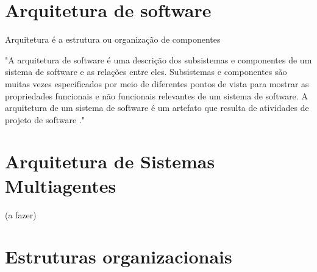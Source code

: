 \section{Arquitetura de software}

Arquitetura é a estrutura ou organização de componentes 

\begin{citacao}
"A arquitetura de software é uma descrição dos subsistemas e componentes de um sistema de software e as relações entre eles. Subsistemas e componentes são muitas vezes especificados por meio de diferentes pontos de vista para mostrar as propriedades funcionais e não funcionais relevantes de um sistema de software. A arquitetura de um sistema de software é um artefato que resulta de atividades de projeto de software \cite{buschmann2007}."
\end{citacao}

\section{Arquitetura de Sistemas Multiagentes}


(a fazer)

\section{Estruturas organizacionais}

\cite{kolp2006}
